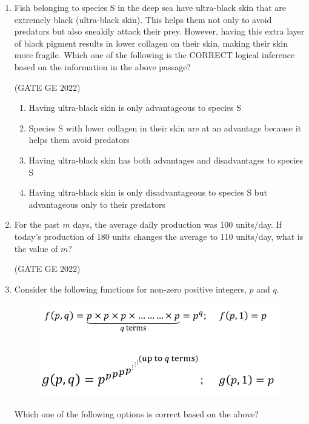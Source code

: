 \documentclass[journal,12pt,onecolumn]{IEEEtran}
\theoremstyle{remark}
\begin{document}
\begin{enumerate}
\item Fish belonging to species S in the deep sea have ultra-black skin that are extremely black (ultra-black skin). This helps them not only to avoid predators but also sneakily attack their prey. However, having this extra layer of black pigment results in lower collagen on their skin, making their skin more fragile. 
Which one of the following is the CORRECT logical inference based on the information in the above passage?

\hfill (GATE GE 2022)

\begin{enumerate}
    \item Having ultra-black skin is only advantageous to species S
    \item Species S with lower collagen in their skin are at an advantage because it helps them avoid predators
    \item Having ultra-black skin has both advantages and disadvantages to species S
    \item Having ultra-black skin is only disadvantageous to species S but advantageous only to their predators
\end{enumerate}

\item For the past $m$ days, the average daily production was 100 units/day. If today's production of 180 units changes the average to 110 units/day, what is the value of $m$?

\hfill (GATE GE 2022)

\begin{enumerate}
\end{enumerate}

\item Consider the following functions for non-zero positive integers, $p$ and $q$.
\begin{figure}[H]
    \centering
    \includegraphics[width=0.6\columnwidth]{figs/fig_8.png}
    \label{fig:placeholder}
\end{figure}
Which one of the following options is correct based on the above?


\end{enumerate}
\end{document}
